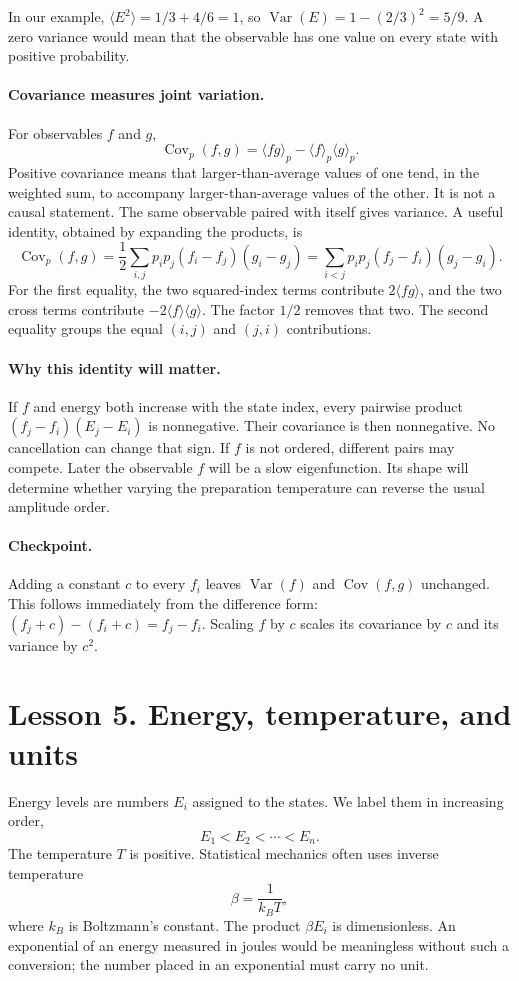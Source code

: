 \documentclass[11pt]{article}
\newcommand{\Cov}{\operatorname{Cov}}
\newcommand{\Var}{\operatorname{Var}}
\begin{document}
In our example, $\langle E^2\rangle=1/3+4/6=1$, so
$\Var(E)=1-(2/3)^2=5/9$. A zero variance would mean that the observable has
one value on every state with positive probability.

\paragraph{Covariance measures joint variation.}
For observables $f$ and $g$,
\[
\Cov_p(f,g)=\langle fg\rangle_p-\langle f\rangle_p\langle g\rangle_p.
\]
Positive covariance means that larger-than-average values of one tend, in the
weighted sum, to accompany larger-than-average values of the other. It is not
a causal statement. The same observable paired with itself gives variance.
A useful identity, obtained by expanding the products, is
\[
\Cov_p(f,g)=\frac12\sum_{i,j}p_ip_j(f_i-f_j)(g_i-g_j)
=\sum_{i<j}p_ip_j(f_j-f_i)(g_j-g_i).
\]
For the first equality, the two squared-index terms contribute
$2\langle fg\rangle$, and the two cross terms contribute
$-2\langle f\rangle\langle g\rangle$. The factor $1/2$ removes that two.
The second equality groups the equal $(i,j)$ and $(j,i)$ contributions.

\paragraph{Why this identity will matter.}
If $f$ and energy both increase with the state index, every pairwise product
$(f_j-f_i)(E_j-E_i)$ is nonnegative. Their covariance is then nonnegative.
No cancellation can change that sign. If $f$ is not ordered, different pairs
may compete. Later the observable $f$ will be a slow eigenfunction. Its shape
will determine whether varying the preparation temperature can reverse the
usual amplitude order.

\paragraph{Checkpoint.}
Adding a constant $c$ to every $f_i$ leaves $\Var(f)$ and $\Cov(f,g)$ unchanged.
This follows immediately from the difference form: $(f_j+c)-(f_i+c)=f_j-f_i$.
Scaling $f$ by $c$ scales its covariance by $c$ and its variance by $c^2$.

\clearpage
\section*{Lesson 5. Energy, temperature, and units}
Energy levels are numbers $E_i$ assigned to the states. We label them in
increasing order,
\[
E_1<E_2<\cdots<E_n.
\]
The temperature $T$ is positive. Statistical mechanics often uses inverse
temperature
\[
\beta=\frac{1}{k_B T},
\]
where $k_B$ is Boltzmann's constant. The product $\beta E_i$ is dimensionless.
An exponential of an energy measured in joules would be meaningless without
such a conversion; the number placed in an exponential must carry no unit.
\end{document}
